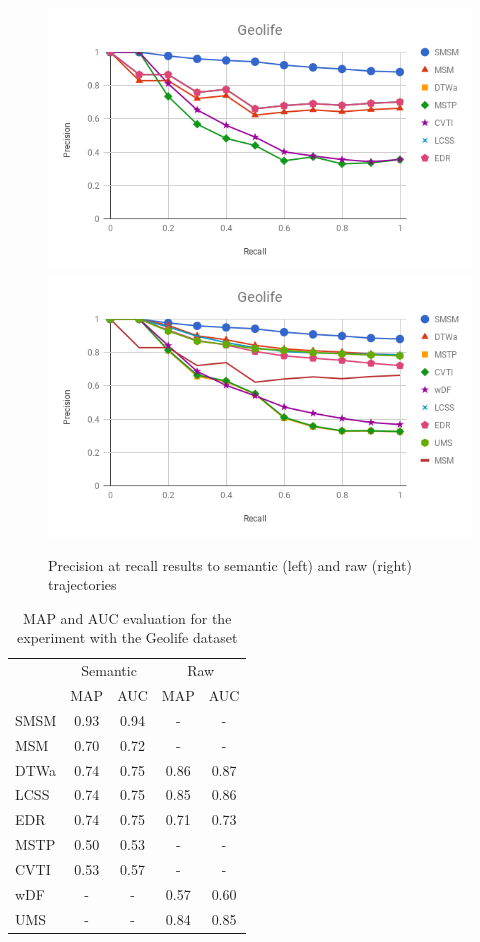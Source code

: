 \documentclass[12pt]{article}
\begin{document}
\begin{figure}[ht!]
\centerline{
\centering
\includegraphics[width=.55\textwidth]{Images/P_R-chart_Geolife.png}
\includegraphics[width=.55\textwidth]{Images/P_R-chart_Geolife-raw.png}
}
\caption{Precision at recall results to semantic (left) and raw (right) trajectories}
\label{fig:geolife_precision_recall}
\end{figure}

\begin{table}[ht!]
  \scriptsize
  \centering
  \begin{tabular}{|l|c|c|c|c|}
  	\hline
 & \multicolumn{2}{c}{Semantic}& \multicolumn{2}{|c|}{Raw}\\
 	\cline{2-5}
 & MAP & AUC& MAP & AUC\\
  	\hline
SMSM & 0.93 & 0.94 & - & -\\
 MSM & 0.70 & 0.72 & - & -\\
DTWa & 0.74 & 0.75 & 0.86 & 0.87\\
LCSS & 0.74 & 0.75 & 0.85 & 0.86\\
 EDR & 0.74 & 0.75 & 0.71 & 0.73\\
MSTP & 0.50 & 0.53 & - & -\\
CVTI & 0.53 & 0.57 & - & -\\
 wDF & - & - & 0.57 & 0.60\\
 UMS & - & - & 0.84 & 0.85\\
    \hline
  \end{tabular}
  \caption{MAP and AUC evaluation for the experiment with the Geolife dataset}
  \label{tab:geolife_measures_map_auc}
\end{table}
\end{document}

